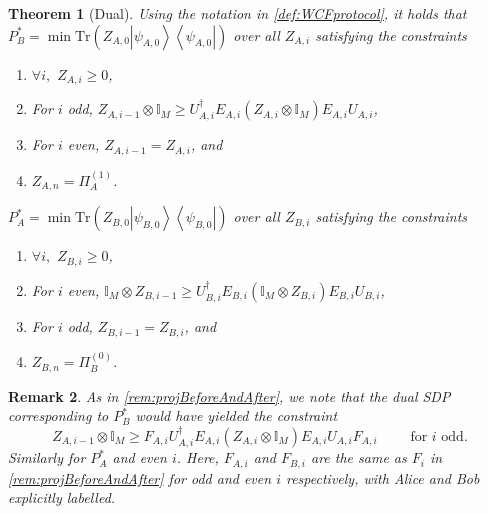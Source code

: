 \documentclass{article}
\newtheorem{theorem}{Theorem}\newtheorem{lemma}[theorem]{Lemma}\newtheorem{proposition}[theorem]{Proposition}\newtheorem{corollary}[theorem]{Corollary}\newtheorem{definition}[theorem]{Definition}\newtheorem{claim}[theorem]{Claim}\newtheorem{remark}[theorem]{Remark}\newtheorem{example}[theorem]{Example}
\newcommand{\atul}[1]{#1} %
\begin{document}
\begin{theorem}[Dual] Using the notation in \cref{def:WCFprotocol}, it holds that
  \label{thm:dual}~\\
  $P_{B}^{*}=\min\text{Tr}(Z_{A,0}\left|\psi_{A,0}\right\rangle \left\langle \psi_{A,0}\right|)$
  over all $Z_{A,i}$ satisfying the constraints
  \begin{enumerate}
    \item $\forall i,$ $Z_{A,i}\ge0$,
    \item For $i$ odd, $Z_{A,i-1}\otimes\mathbb{I}_{M}\ge U_{A,i}^{\dagger}E_{A,i}(Z_{A,i}\otimes\mathbb{I}_{M})E_{A,i}U_{A,i}$,
    \item For $i$ even, $Z_{A,i-1}=Z_{A,i}$, and
    \item $Z_{A,n}=\Pi_{A}^{(1)}$.
  \end{enumerate}
  $P_{A}^{*}=\min\text{Tr}(Z_{B,0}\left|\psi_{B,0}\right\rangle \left\langle \psi_{B,0}\right|)$
  over all $Z_{B,i}$ satisfying the constraints
  \begin{enumerate}
    \item $\forall i,$ $Z_{B,i}\ge0$,
    \item For $i$ even, $\mathbb{I}_{M}\otimes Z_{B,i-1}\ge U_{B,i}^{\dagger}E_{B,i}(\mathbb{I}_{M}\otimes Z_{B,i})E_{B,i}U_{B,i}$,
    \item For $i$ odd, $Z_{B,i-1}=Z_{B,i}$, and
    \item $Z_{B,n}=\Pi_{B}^{(0)}$.
  \end{enumerate}
\end{theorem}

%


\begin{remark}
  As in \cref{rem:projBeforeAndAfter}, we note that the dual SDP corresponding to $P_{B}^{*}$
  would have yielded the constraint
  \begin{displaymath}
    Z_{A,i-1}\otimes\mathbb{I}_{M}\ge F_{A,i}U_{A,i}^{\dagger}E_{A,i}\left(Z_{A,i}\otimes\mathbb{I}_{M}\right)E_{A,i}U_{A,i}F_{A,i} \qquad \text{  for $i$ odd}.
  \end{displaymath}
  Similarly for $P_A^*$ and even $i$. \atul{Here, $F_{A,i}$ and $F_{B,i}$ are the same as $F_i$ in \cref{rem:projBeforeAndAfter} for odd and even $i$ respectively, with Alice and Bob explicitly labelled.}
  \label{rem:projBeforeAndAfterDual}
\end{remark}
%
%

%
\end{document}
